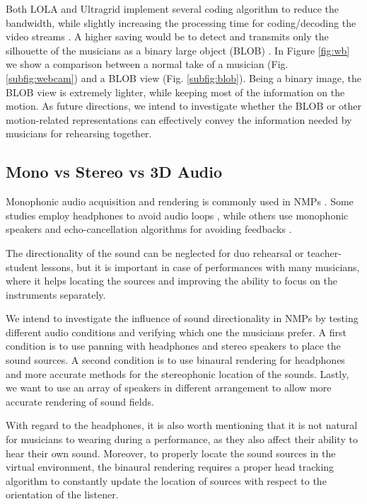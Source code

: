 Both LOLA and Ultragrid implement several coding algorithm to reduce the bandwidth, while slightly increasing the processing time for coding/decoding the video streams \cite{drioli2013networked,holub2006high}. A higher saving would be to detect and transmits only the silhouette of the musicians as a binary large object (BLOB) \cite{camurri2010visual}. In Figure \ref{fig:wb} we show a comparison between a normal take of a musician (Fig. \ref{subfig:webcam}) and a BLOB view (Fig. \ref{subfig:blob}).
Being a binary image, the BLOB view is extremely lighter, while keeping most of the information on the motion. As future directions, we intend to investigate whether the BLOB or other motion-related representations can effectively convey the information needed by musicians for rehearsing together. 


\subsection{Mono vs Stereo vs 3D Audio}
Monophonic audio acquisition and rendering is commonly used in NMPs \cite{CIM2018}. Some studies employ headphones to avoid audio loops \cite{RottondiFeature}, while others use monophonic speakers and echo-cancellation algorithms for avoiding feedbacks \cite{drioli2013networked}. 

The directionality of the sound can be neglected for duo rehearsal or teacher-student lessons, but it is important in case of performances with many musicians, where it helps locating the sources and improving the ability to focus on the instruments separately. 

We intend to investigate the influence of sound directionality in NMPs by testing different audio conditions and verifying which one the musicians prefer. A first condition is to use panning with headphones and stereo speakers to place the sound sources. A second condition is to use binaural rendering for headphones and more accurate methods for the stereophonic location of the sounds. Lastly, we want to use an array of speakers in different arrangement to allow more accurate rendering of sound fields. 

With regard to the headphones, it is also worth mentioning that it is not natural for musicians to wearing during a performance, as they also affect their ability to hear their own sound. Moreover, to properly locate the sound sources in the virtual environment, the binaural rendering requires a proper head tracking algorithm to constantly update the location of sources with respect to the orientation of the listener.

